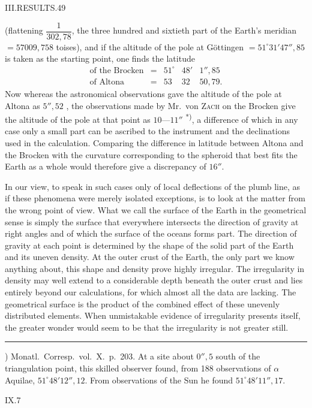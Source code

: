 \clearpage
\noindent\mbox{}\hfill III.\quad RESULTS.\hfill 49\par
\noindent{} (flattening $\dfrac1{302{,}78}$, the three hundred and sixtieth part of the Earth's meridian $=57009{,}758$ toises), and if the altitude of the pole at Göttingen $=51^\circ31'47''{,}85$ is taken as the starting point, one finds the latitude
\[
\begin{array}{lcrrr}
\text{of the Brocken}&=&51^\circ&48'&1''{,}85\\
\text{of Altona}&=&53&32&50{,}79.
\end{array}
\]
Now whereas the astronomical observations gave the altitude of the pole at Altona as $5''{,}52$ , the observations made by Mr.\ von \textsc{Zach} on the Brocken give the altitude of the pole at that point as $10\text{—}11''$ \textsuperscript{*)}, a difference of which in any case only a small part can be ascribed to the instrument and the declinations used in the calculation. Comparing the difference in latitude between Altona and the Brocken with the curvature corresponding to the spheroid that best fits the Earth as a whole would therefore give a discrepancy of $16''$.

In our view, to speak in such cases only of local deflections of the plumb line, as if these phenomena were merely isolated exceptions, is to look at the matter from the wrong point of view. What we call the surface of the Earth in the geometrical sense is simply the surface that everywhere intersects the direction of gravity at right angles and of which the surface of the oceans forms part. The direction of gravity at each point is determined by the shape of the solid part of the Earth and its uneven density. At the outer crust of the Earth, the only part we know anything about, this shape and density prove highly irregular. The irregularity in density may well extend to a considerable depth beneath the outer crust and lies entirely beyond our calculations, for which almost all the data are lacking. The geometrical surface is the product of the combined effect of these unevenly distributed elements. When unmistakable evidence of irregularity presents itself, the greater wonder would seem to be that the irregularity is not greater still.
\par\noindent\rule{.25\textwidth}{.4pt}\par
{\footnotesize *) Monatl.\ Corresp.\ vol.\ X.\ p.\ 203. At a site about $0''{,}5$ south of the triangulation point, this skilled observer found, from 188 observations of $\alpha$ Aquilae, $51^\circ48'12''{,}12$. From observations of the Sun he found $51^\circ48'11''{,}17$.\par}
\noindent IX.\hfill 7\par

